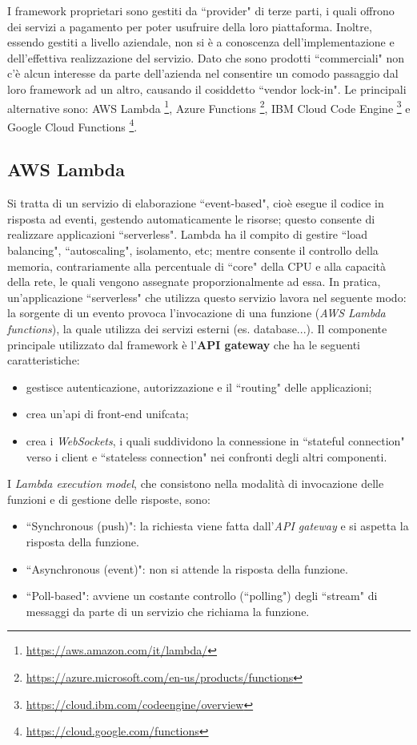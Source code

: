 \documentclass[12pt,a4paper,openany,twoside]{book}
\begin{document}
I framework proprietari sono gestiti da ``provider" di terze parti, i quali offrono dei servizi a pagamento per poter usufruire della loro piattaforma. Inoltre, essendo gestiti a livello aziendale, non si è a conoscenza dell'implementazione e dell'effettiva realizzazione del servizio. Dato che sono prodotti ``commerciali" non c'è alcun interesse da parte dell'azienda nel consentire un comodo passaggio dal loro framework ad un altro, causando il cosiddetto ``vendor lock-in".
Le principali alternative sono: AWS Lambda \footnote{\url{https://aws.amazon.com/it/lambda/}}, Azure Functions \footnote{\url{https://azure.microsoft.com/en-us/products/functions}}, IBM Cloud Code Engine \footnote{\url{https://cloud.ibm.com/codeengine/overview}} e Google Cloud Functions \footnote{\url{https://cloud.google.com/functions}}.

\subsection{AWS Lambda}

Si tratta di un servizio di elaborazione ``event-based", cioè esegue il codice in risposta ad eventi, gestendo automaticamente le risorse; questo consente di realizzare applicazioni ``serverless".
Lambda ha il compito di gestire ``load balancing", ``autoscaling", isolamento, etc; mentre consente il controllo della memoria, contrariamente alla percentuale di ``core" della CPU e alla capacità della rete, le quali vengono assegnate proporzionalmente ad essa. In pratica, un'applicazione ``serverless" che utilizza questo servizio lavora nel seguente modo: la sorgente di un evento provoca l'invocazione di una funzione (\textit{AWS Lambda functions}), la quale utilizza dei servizi esterni (es. database...).
Il componente principale utilizzato dal framework è l'\textbf{API gateway} che ha le seguenti caratteristiche:
\begin{itemize}
    \item gestisce autenticazione, autorizzazione e il ``routing" delle applicazioni;
    
    \item crea un'\ac{api} di front-end unifcata;
    
    \item crea i \textit{WebSockets}, i quali suddividono la connessione in ``stateful connection" verso i client e ``stateless connection" nei confronti degli altri componenti.
\end{itemize}
I \textit{Lambda execution model}, che consistono nella modalità di invocazione delle funzioni e di gestione delle risposte, sono:
\begin{itemize}
    \item ``Synchronous (push)": la richiesta viene fatta dall'\textit{API gateway} e si aspetta la risposta della funzione.
    
    \item ``Asynchronous (event)": non si attende la risposta della funzione.
    
    \item ``Poll-based": avviene un costante controllo (``polling") degli ``stream" di messaggi da parte di un servizio che richiama la funzione.
\end{itemize}
\end{document}
